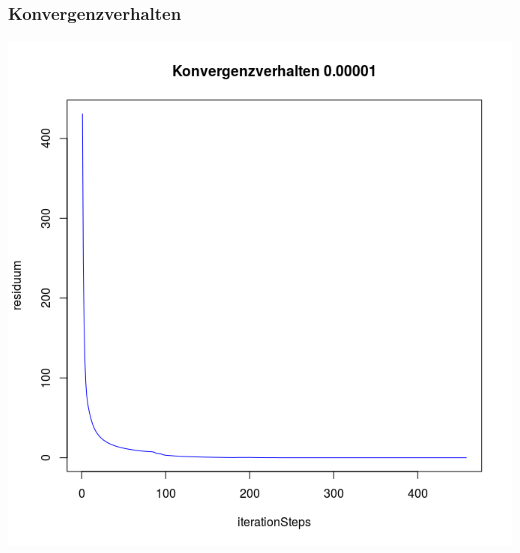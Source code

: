 \documentclass[]{beamer}
\begin{document}
\begin{frame}
\frametitle{Konvergenzverhalten}
\begin{center}
\includegraphics[scale=0.3]{Konvergenz.png}
\end{center}
\end{frame}
\end{document}
